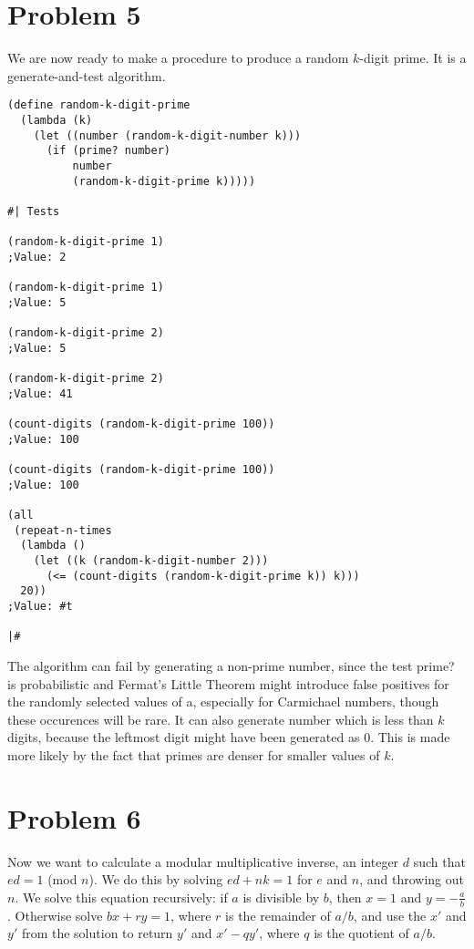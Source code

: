 \documentclass[12pt]{article}
\begin{document}
\section{Problem 5}

We are now ready to make a procedure to produce a random $k$-digit
prime. It is a generate-and-test algorithm.

\begin{verbatim}
(define random-k-digit-prime
  (lambda (k)
    (let ((number (random-k-digit-number k)))
      (if (prime? number)
          number
          (random-k-digit-prime k)))))

#| Tests

(random-k-digit-prime 1)
;Value: 2

(random-k-digit-prime 1)
;Value: 5

(random-k-digit-prime 2)
;Value: 5

(random-k-digit-prime 2)
;Value: 41

(count-digits (random-k-digit-prime 100))
;Value: 100

(count-digits (random-k-digit-prime 100))
;Value: 100

(all
 (repeat-n-times
  (lambda ()
    (let ((k (random-k-digit-number 2)))
      (<= (count-digits (random-k-digit-prime k)) k)))
  20))
;Value: #t

|#
\end{verbatim}

The algorithm can fail by generating a non-prime number, since the
test prime? is probabilistic and Fermat's Little Theorem might
introduce false positives for the randomly selected values of
a, especially for Carmichael numbers, though these occurences will be
rare.  It can also generate number which is less than $k$ digits,
because the leftmost digit might have been generated as 0. This is
made more likely by the fact that primes are denser for smaller values
of $k$.

\section{Problem 6}

Now we want to calculate a modular multiplicative inverse, an
integer $d$ such that $ed = 1$ (mod $n$). We do this by solving 
$ed + nk = 1$ for $e$ and $n$, and throwing out $n$. We solve this equation
recursively: if $a$ is divisible by $b$, then $x=1$ and
$y=-\frac{a}{b}$. Otherwise solve $bx + ry = 1$, where $r$ is the remainder of
$a/b$, and use the $x'$ and $y'$ from the solution to return $y'$ and $x'-qy'$,
where $q$ is the quotient of $a/b$.
\end{document}
